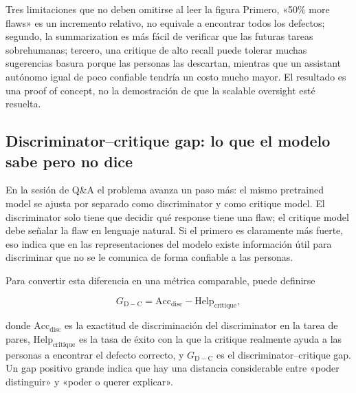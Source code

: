 \begin{warningbox}{Tres limitaciones que no deben omitirse al leer la figura}
Primero, «50\% more flaws» es un incremento relativo, no equivale a encontrar todos los defectos; segundo, la summarization es más fácil de verificar que las futuras tareas sobrehumanas; tercero, una critique de alto recall puede tolerar muchas sugerencias basura porque las personas las descartan, mientras que un assistant autónomo igual de poco confiable tendría un costo mucho mayor. El resultado es una proof of concept, no la demostración de que la scalable oversight esté resuelta.
\end{warningbox}


\subsection{Discriminator--critique gap: lo que el modelo sabe pero no dice}

En la sesión de Q\&A el problema avanza un paso más: el mismo pretrained model se ajusta por separado como discriminator y como critique model. El discriminator solo tiene que decidir qué response tiene una flaw; el critique model debe señalar la flaw en lenguaje natural. Si el primero es claramente más fuerte, eso indica que en las representaciones del modelo existe información útil para discriminar que no se le comunica de forma confiable a las personas.

Para convertir esta diferencia en una métrica comparable, puede definirse

\[
G_{\mathrm{D-C}}=\mathrm{Acc}_{\mathrm{disc}}-\mathrm{Help}_{\mathrm{critique}},
\]

donde $\mathrm{Acc}_{\mathrm{disc}}$ es la exactitud de discriminación del discriminator en la tarea de pares, $\mathrm{Help}_{\mathrm{critique}}$ es la tasa de éxito con la que la critique realmente ayuda a las personas a encontrar el defecto correcto, y $G_{\mathrm{D-C}}$ es el discriminator--critique gap. Un gap positivo grande indica que hay una distancia considerable entre «poder distinguir» y «poder o querer explicar».

